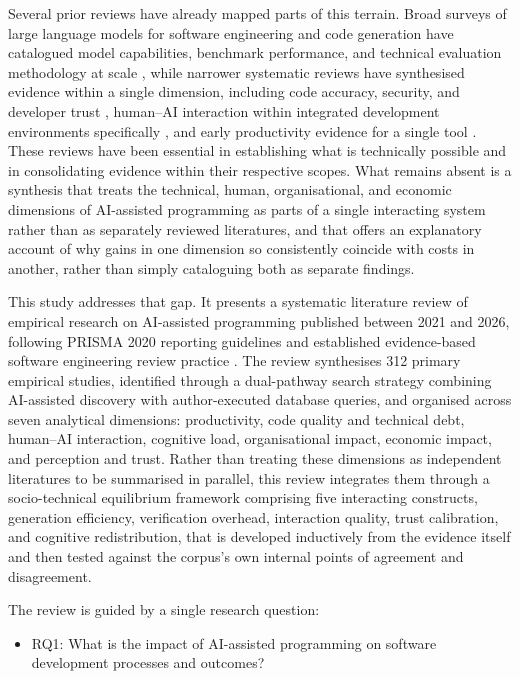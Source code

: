Several prior reviews have already mapped parts of this terrain. Broad surveys of large language models for software engineering and code generation have catalogued model capabilities, benchmark performance, and technical evaluation methodology at scale \cite{hou_large_2023,zhang_survey_2023,jabrw_systematic_2025,chen_survey_2024}, while narrower systematic reviews have synthesised evidence within a single dimension, including code accuracy, security, and developer trust \cite{naaz_rise_2025}, human--AI interaction within integrated development environments specifically \cite{sergeyuk_human-ai_2026}, and early productivity evidence for a single tool \cite{adepoju_github_2023}. These reviews have been essential in establishing what is technically possible and in consolidating evidence within their respective scopes. What remains absent is a synthesis that treats the technical, human, organisational, and economic dimensions of AI-assisted programming as parts of a single interacting system rather than as separately reviewed literatures, and that offers an explanatory account of why gains in one dimension so consistently coincide with costs in another, rather than simply cataloguing both as separate findings.

This study addresses that gap. It presents a systematic literature review of empirical research on AI-assisted programming published between 2021 and 2026, following PRISMA 2020 reporting guidelines \cite{page_prisma_2021} and established evidence-based software engineering review practice \cite{kitchenham_guidelines_2007}. The review synthesises 312 primary empirical studies, identified through a dual-pathway search strategy combining AI-assisted discovery with author-executed database queries, and organised across seven analytical dimensions: productivity, code quality and technical debt, human--AI interaction, cognitive load, organisational impact, economic impact, and perception and trust. Rather than treating these dimensions as independent literatures to be summarised in parallel, this review integrates them through a socio-technical equilibrium framework comprising five interacting constructs, generation efficiency, verification overhead, interaction quality, trust calibration, and cognitive redistribution, that is developed inductively from the evidence itself and then tested against the corpus's own internal points of agreement and disagreement.

The review is guided by a single research question:

\begin{itemize}
    \item RQ1: What is the impact of AI-assisted programming on software development processes and outcomes?
\end{itemize}


